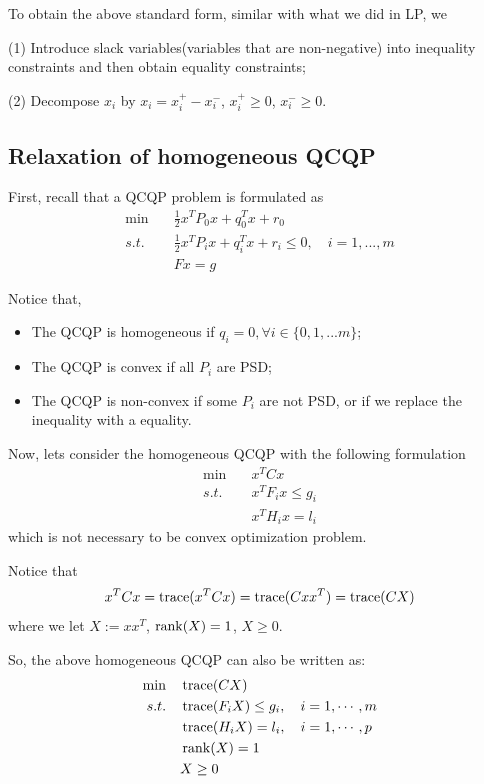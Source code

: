 To obtain the above standard form, similar with what we did in LP, we

(1) Introduce slack variables(variables that are non-negative) into inequality constraints and then obtain equality constraints;
	
(2) Decompose $x_i$ by $x_i = x_i^+ - x_i^-$, $x_i^+\geq 0$, $x_i^-\geq 0$.


\vspace{0.5cm}
\subsection{Relaxation of homogeneous QCQP}
First, recall that a QCQP problem is formulated as 
\begin{align*}
\min \quad&\frac{1}{2}x^TP_0x + q_0^Tx + r_0 \\
s.t. \quad&\frac{1}{2}x^TP_ix + q_i^Tx + r_i\leq 0,\quad i = 1,...,m\\
&Fx = g
\end{align*}

Notice that,
\begin{itemize}
	\item The QCQP is homogeneous if $q_i = 0, \forall i\in \{0,1,...m \}$;
	
	\item The QCQP is convex if all $P_i$ are PSD;
	
	\item The QCQP is non-convex if some $P_i$ are not PSD, or if we replace the inequality with a equality.
	
\end{itemize}

\vspace{0.3cm}
Now, lets consider the homogeneous QCQP with the following formulation
\begin{align*}
\min \quad&x^TCx \\
s.t. \quad&x^TF_ix \leq g_i\\
&x^TH_ix = l_i
\end{align*}
which is not necessary to be convex optimization problem.

Notice that
\begin{equation*}
x^TCx = \operatorname{trace}(x^TCx) = \operatorname{trace}(Cxx^T) = \operatorname{trace}(CX)
\end{equation*}
where we let $X := xx^T$, $\operatorname{rank}(X) = 1$, $X\geq0$. 

So, the above homogeneous QCQP can also be written as:
\begin{align*}
\min \quad&\operatorname{trace}(CX) \\
s.t. \quad&\operatorname{trace}(F_iX) \leq g_i, \quad i = 1,\cdots,m\\
&\operatorname{trace}(H_iX) = l_i, \quad i = 1,\cdots,p\\
&\operatorname{rank}(X) = 1\\
&X\geq 0
\end{align*}

